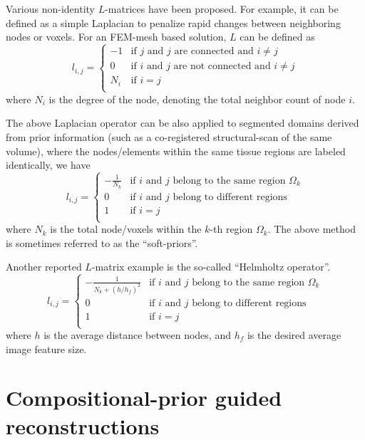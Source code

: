 \documentclass[12pt]{book}               %
\begin{document}
Various non-identity $L$-matrices have been proposed. For example, it can be defined as a simple Laplacian to penalize rapid changes between neighboring nodes or voxels. For an FEM-mesh based solution, $L$ can be defined as 
\begin{equation}
l_{i,j}=\left\{\begin{array}{cl}
-1 & \textrm{if $j$ and $j$ are connected and $i\ne j$}\\
0 &\textrm{if $i$ and $j$ are not connected and $i\ne j$}\\
N_i & \textrm{if $i=j$}\\
\end{array}\right.
\end{equation}
where $N_i$ is the degree of the node, denoting the total neighbor count of node $i$.

The above Laplacian operator can be also applied to segmented domains derived from prior information (such as a co-registered structural-scan of the same volume), where the nodes/elements within the same tissue regions are labeled identically, we have
\begin{equation}
l_{i,j}=\left\{\begin{array}{cl}
-\frac{1}{N_k} & \textrm{if $i$ and $j$ belong to the same region $\Omega_k$}\\
0 &\textrm{if $i$ and $j$ belong to different regions}\\
1 & \textrm{if $i=j$}\\
\end{array}\right.
\end{equation}
where $N_k$ is the total node/voxels within the $k$-th region $\Omega_k$. The above method is sometimes referred to as the ``soft-priors''.

Another reported $L$-matrix example is the so-called ``Helmholtz operator''. 
\begin{equation}
l_{i,j}=\left\{\begin{array}{cl}
-\frac{1}{N_k +(h/h_f)^2}& \textrm{if $i$ and $j$ belong to the same region $\Omega_k$}\\
0 &\textrm{if $i$ and $j$ belong to different regions}\\
1 & \textrm{if $i=j$}\\
\end{array}\right.
\end{equation}
where $h$ is the average distance between nodes, and $h_f$ is the desired average image feature size.

\section{Compositional-prior guided reconstructions}
\end{document}
